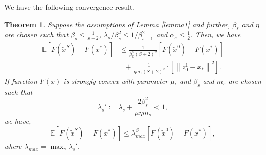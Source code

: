 \documentclass[conference]{IEEEtran}
\newcommand*{\E}{\mathbb{E}}
\newcommand{\norm}[1]{\left\lVert#1\right\rVert}
\newtheorem{theorem}{Theorem}[section]
\theoremstyle{definition}
\theoremstyle{remark}
\begin{document}
We have the following convergence result.
\begin{theorem}\label{conve-theorem}
Suppose the assumptions of Lemma \ref{lemma1} and further, $\beta_s$ and $\eta$ are chosen such that $\beta_s\leq \frac{1}{s+2}$,  $\lambda_s/\beta_s^2 \leq 1/\beta_{s-1}^2$ and $\alpha_s\leq \frac{1}{2}$.
Then, we have
\begin{equation}
\begin{split}
{\E[F(\widetilde{x}^S)-F(x^*)]}&\leq \frac{1}{\beta_{0}^2(S+2)^2}[F(\widetilde{x}^{0})-F(x^*)] \\ 
&~~~ + {\frac{1}{\eta m_{1}(S+2)^2}}\E[\norm{z_{0}^1-x_*}^2].
\end{split}
\end{equation}
If function $F(x)$ is strongly convex with parameter $\mu$, and $\beta_s$ and $m_s$ are chosen such that
\[
\lambda_s' := \lambda_s+{\frac{2 \beta_s^2}{\mu\eta m_s}} < 1,
\]
we have, 
\begin{equation}
\E\left[F(\widetilde{x}^S)-F(x^*)\right]\leq \lambda_{max}^S\left[F(\widetilde{x}^0)-F(x^*)\right],
\end{equation}
where $\lambda_{max} = \max_{s}{\lambda_s'}$.
\end{theorem}
\end{document}
